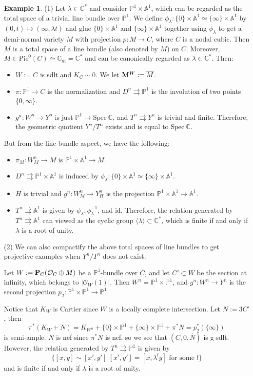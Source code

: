 \documentclass[11pt]{amsart}
\numberwithin{equation}{section}
\newcommand{\Mm}{{\bf{M}}}
\newcommand{\PP}{{\bf{P}}}
\newcommand{\Spec}{\mathrm{Spec}}
\newcommand{\id}{\mathrm{id}}
\newcommand{\Cc}{\mathbb{C}}
\newcommand{\Pp}{\mathbb{P}}
\newcommand{\Oo}{\mathcal{O}}
\newcommand{\Pic}{\mathrm{Pic}}
\theoremstyle{definition}
\theoremstyle{definition}
\newtheorem{ex}[thm]{Example}
\theoremstyle{definition}
\begin{document}
\begin{ex}\label{ex: relation is not finite in general}
(1) Let $\lambda\in\Cc^*$ and consider $\Pp^1\times \mathbb{A}^1$, which can be regarded as the total space of a trivial line bundle over $\Pp^1$. We define $\phi_\lambda: \{0\}\times\mathbb{A}^1\simeq\{\infty\}\times\mathbb{A}^1$ by $(0,t)\mapsto(\infty,\lambda t)$ and glue $\{0\}\times\mathbb{A}^1$ and $\{\infty\}\times\mathbb{A}^1$ together using $\phi_\lambda$ to get a demi-normal variety $M$ with projection $p:M\to C$, where $C$ is a nodal cubic. Then $M$ is a total space of a line bundle (also denoted by $M$) on $C$. Moreover, $M\in\Pic^0(C)\simeq\mathbb{G}_m=\Cc^*$ and can be canonically regarded as $\lambda\in\Cc^*$. Then:
\begin{itemize}
    \item $W:=C$ is sdlt and $K_C\sim 0$. We let $\Mm^W:=\overline{M}$.
    \item $\pi:\Pp^1\to C$ is the normalization and $D^n\rightrightarrows\Pp^1$ is the involution of two points $\{0,\infty\}$.
    \item $g^n: W^n\to Y^n$ is just $\Pp^1\to\Spec~\Cc$, and $T^n\rightrightarrows Y^n$ is trivial and finite. Therefore, the geometric quotient $Y^n/T^n$ exists and is equal to $\Spec~\Cc$. 
\end{itemize}
But from the line bundle aspect, we have the following:
\begin{itemize}
    \item $\pi_M:W^n_M\to M$ is $\Pp^1\times\mathbb{A}^1\to M$.
    \item $D^n\rightrightarrows\Pp^1\times\mathbb{A}^1$ is induced by $\phi_{\lambda}:\{0\}\times\mathbb{A}^1\simeq\{\infty\}\times\mathbb{A}^1$.
    \item $H$ is trivial and $g^n: W^n_M\to Y^n_H$ is the projection $\Pp^1\times\mathbb{A}^1\to \mathbb{A}^1$.
    \item $T^n\rightrightarrows \mathbb{A}^1$ is given by $\phi_\lambda,\phi^{-1}_\lambda$, and $\id$. Therefore, the relation generated by $T^n\rightrightarrows\mathbb{A}^1$ can viewed as the cyclic group $\langle\lambda\rangle\subset\Cc^*$, which is finite if and only if $\lambda$ is a root of unity.
\end{itemize}
(2) We can also compactify the above total spaces of line bundles to get projective examples when $Y^n/T^n$ does not exist.

Let $W:=\PP_C(\Oo_C\oplus M)$ be a $\Pp^1$-bundle over $C$, and let $C'\subset W$ be the section at infinity, which belongs to $|\Oo_W(1)|$. Then $W^n=\Pp^1\times\Pp^1$, and $g^n:W^n\to Y^n$ is the second projection $p_2: \Pp^1\times\Pp^1\to\Pp^1$.

Notice that $K_W$ is Cartier since $W$ is a locally complete intersection. Let $N:=3C'$, then $$\pi^*(K_W+N)=K_{W^n}+\{0\}\times\Pp^1+\{\infty\}\times\Pp^1+\pi^*N=p_2^*(\{\infty\})$$ 
is semi-ample. $N$ is nef since $\pi^*N$ is nef, so we see that $(C,0,\overline{N})$ is g-sdlt. However, the relation generated by $T^n\rightrightarrows\Pp^1$ is given by
$$\{[x,y]\sim[x',y']|[x',y']=[x,\lambda^ly] \text{ for some $l$}\}$$
and is finite if and only if $\lambda$ is a root of unity.
\end{ex}
\end{document}
